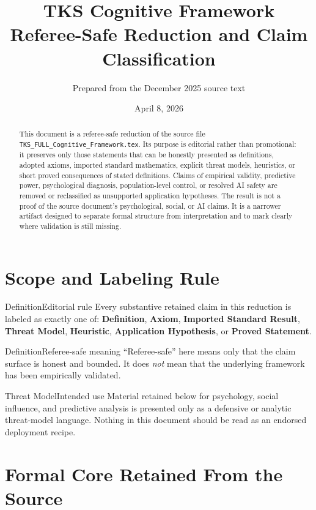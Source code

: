 \documentclass[11pt]{article}
\title{\textbf{TKS Cognitive Framework}\\[0.5em]
\large Referee-Safe Reduction and Claim Classification}
\author{Prepared from the December 2025 source text}
\date{April 8, 2026}
\theoremstyle{plain}
\begin{document}
\maketitle

\begin{abstract}
This document is a referee-safe reduction of the source file
\texttt{TKS\_FULL\_Cognitive\_Framework.tex}. Its purpose is editorial rather
than promotional: it preserves only those statements that can be honestly
presented as definitions, adopted axioms, imported standard mathematics,
explicit threat models, heuristics, or short proved consequences of stated
definitions. Claims of empirical validity, predictive power, psychological
diagnosis, population-level control, or resolved AI safety are removed or
reclassified as unsupported application hypotheses. The result is not a proof
of the source document's psychological, social, or AI claims. It is a narrower
artifact designed to separate formal structure from interpretation and to mark
clearly where validation is still missing.
\end{abstract}

\section{Scope and Labeling Rule}

\begin{claimbox}{Definition}{Editorial rule}
Every substantive retained claim in this reduction is labeled as exactly one of:
\textbf{Definition}, \textbf{Axiom}, \textbf{Imported Standard Result},
\textbf{Threat Model}, \textbf{Heuristic}, \textbf{Application Hypothesis}, or
\textbf{Proved Statement}.
\end{claimbox}

\begin{claimbox}{Definition}{Referee-safe meaning}
``Referee-safe'' here means only that the claim surface is honest and bounded.
It does \emph{not} mean that the underlying framework has been empirically
validated.
\end{claimbox}

\begin{claimbox}{Threat Model}{Intended use}
Material retained below for psychology, social influence, and predictive
analysis is presented only as a defensive or analytic threat-model language.
Nothing in this document should be read as an endorsed deployment recipe.
\end{claimbox}

\section{Formal Core Retained From the Source}
\end{document}
